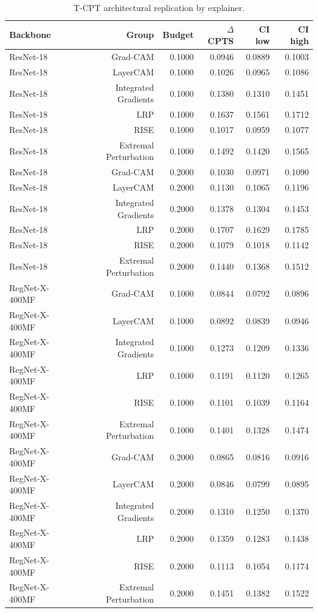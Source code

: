 \begin{table}[t]
\centering
\caption{T-CPT architectural replication by explainer.}
\label{tab:tcpt_backbone_explainer}
\begin{tabular}{lrrrrr}
\toprule
Backbone & Group & Budget & $\Delta$CPTS & CI low & CI high \\
\midrule
ResNet-18 & Grad-CAM & 0.1000 & 0.0946 & 0.0889 & 0.1003 \\
ResNet-18 & LayerCAM & 0.1000 & 0.1026 & 0.0965 & 0.1086 \\
ResNet-18 & Integrated Gradients & 0.1000 & 0.1380 & 0.1310 & 0.1451 \\
ResNet-18 & LRP & 0.1000 & 0.1637 & 0.1561 & 0.1712 \\
ResNet-18 & RISE & 0.1000 & 0.1017 & 0.0959 & 0.1077 \\
ResNet-18 & Extremal Perturbation & 0.1000 & 0.1492 & 0.1420 & 0.1565 \\
ResNet-18 & Grad-CAM & 0.2000 & 0.1030 & 0.0971 & 0.1090 \\
ResNet-18 & LayerCAM & 0.2000 & 0.1130 & 0.1065 & 0.1196 \\
ResNet-18 & Integrated Gradients & 0.2000 & 0.1378 & 0.1304 & 0.1453 \\
ResNet-18 & LRP & 0.2000 & 0.1707 & 0.1629 & 0.1785 \\
ResNet-18 & RISE & 0.2000 & 0.1079 & 0.1018 & 0.1142 \\
ResNet-18 & Extremal Perturbation & 0.2000 & 0.1440 & 0.1368 & 0.1512 \\
RegNet-X-400MF & Grad-CAM & 0.1000 & 0.0844 & 0.0792 & 0.0896 \\
RegNet-X-400MF & LayerCAM & 0.1000 & 0.0892 & 0.0839 & 0.0946 \\
RegNet-X-400MF & Integrated Gradients & 0.1000 & 0.1273 & 0.1209 & 0.1336 \\
RegNet-X-400MF & LRP & 0.1000 & 0.1191 & 0.1120 & 0.1265 \\
RegNet-X-400MF & RISE & 0.1000 & 0.1101 & 0.1039 & 0.1164 \\
RegNet-X-400MF & Extremal Perturbation & 0.1000 & 0.1401 & 0.1328 & 0.1474 \\
RegNet-X-400MF & Grad-CAM & 0.2000 & 0.0865 & 0.0816 & 0.0916 \\
RegNet-X-400MF & LayerCAM & 0.2000 & 0.0846 & 0.0799 & 0.0895 \\
RegNet-X-400MF & Integrated Gradients & 0.2000 & 0.1310 & 0.1250 & 0.1370 \\
RegNet-X-400MF & LRP & 0.2000 & 0.1359 & 0.1283 & 0.1438 \\
RegNet-X-400MF & RISE & 0.2000 & 0.1113 & 0.1054 & 0.1174 \\
RegNet-X-400MF & Extremal Perturbation & 0.2000 & 0.1451 & 0.1382 & 0.1522 \\
\bottomrule
\end{tabular}
\end{table}
